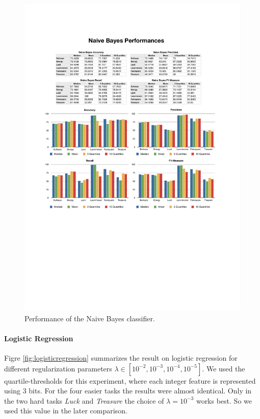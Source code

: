 %
\begin{figure}
    \centering
    \setlength{\tabcolsep}{0.0130\linewidth}
    \includegraphics[width=\linewidth]{figures/NaiveBayes}
    \caption{Performance of the Naive Bayes classifier.%
      \label{fig:naivebayes}}
\end{figure}

\paragraph*{Logistic Regression}
Figre \ref{fig:logisticregression} summarizes the result on logistic regression for different regularization parameters $\lambda \in [10^{-2}, 10^{-3}, 10^{-4}, 10^{-5}]$. We used the quartile-thresholds for this experiment, where each integer feature is represented using 3 bits. For the four easier tasks the results were almost identical. Only in the two hard tasks \emph{Luck} and \emph{Treasure} the choice of $\lambda = 10^{-3}$ works best. So we used this value in the later comparison.

